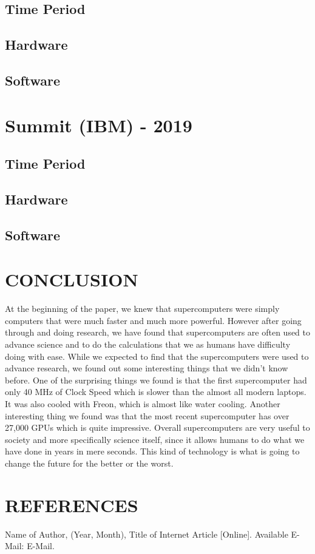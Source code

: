 \documentclass[letterpaper, 10 pt, conference]{IEEEconf}
\begin{document}
\subsection{Time Period}
\subsection{Hardware}
\subsection{Software}

\section{Summit (IBM) - 2019}
\subsection{Time Period}
\subsection{Hardware}
\subsection{Software}

\section{CONCLUSION}

At the beginning of the paper, we knew that supercomputers were simply computers that were much faster and much more powerful. However after going through and doing research, we have found that supercomputers are often used to advance science and to do the calculations that we as humans have difficulty doing with ease. While we expected to find that the supercomputers were used to advance research, we found out some interesting things that we didn't know before. One of the surprising things we found is that the first supercomputer had only 40 MHz of Clock Speed which is slower than the almost all modern laptops. It was also cooled with Freon, which is almost like water cooling. Another interesting thing we found was that the most recent supercomputer has over 27,000 GPUs which is quite impressive. Overall supercomputers are very useful to society and more specifically science itself, since it allows humans to do what we have done in years in mere seconds. This kind of technology is what is going to change the future for the better or the worst.

\section*{REFERENCES}

\begin{enumerate}[label={[\arabic*]}]
\item Name of Author, (Year, Month),
Title of Internet Article [Online]. Available E-Mail:
E-Mail.

\end{enumerate}
\end{document}
